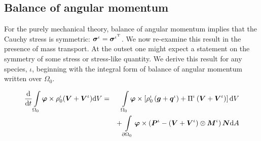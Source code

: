 





\subsection{Balance of angular momentum}
\label{balance-of-angular-momentum}

For the purely mechanical theory, balance of
angular momentum implies that the Cauchy stress is symmetric:
$\mbox{\boldmath$\sigma$}^\iota = \mbox{\boldmath$\sigma$}^{\iota^\mathrm{T}}$. We now re-examine
this result in the presence of mass transport. At the outset one
might expect a statement on the symmetry of some stress or
stress-like quantity. We derive this result for any species,
$\iota$, beginning with the integral form of balance of angular
momentum written over $\Omega_0$.

\begin{eqnarray}
\frac{\mathrm{d}}{\mathrm{d}t} \int\limits_{\Omega_0} \mbox{\boldmath$\varphi$}
\times \rho^\iota_0(\mbox{\boldmath$ V$}+\mbox{\boldmath$ V$}^\iota)\mathrm{d}V &=&
\int\limits_{\Omega_0}\mbox{\boldmath$\varphi$}\times\left[\rho^\iota_0\left(\mbox{\boldmath$ g$}+\mbox{\boldmath$ q$}^\iota\right)+\Pi^\iota\left(\mbox{\boldmath$ V$}+\mbox{\boldmath$ V$}^\iota\right)\right]\mathrm{d}V\nonumber\\
& &+
\int\limits_{\partial\Omega_0}\mbox{\boldmath$\varphi$}\times\left(\mbox{\boldmath$ P$}^\iota-\left(\mbox{\boldmath$ V$}+\mbox{\boldmath$ V$}^\iota\right)\otimes\mbox{\boldmath$ M$}^\iota\right)\mbox{\boldmath$ N$}
\mathrm{d}A
\end{eqnarray}

